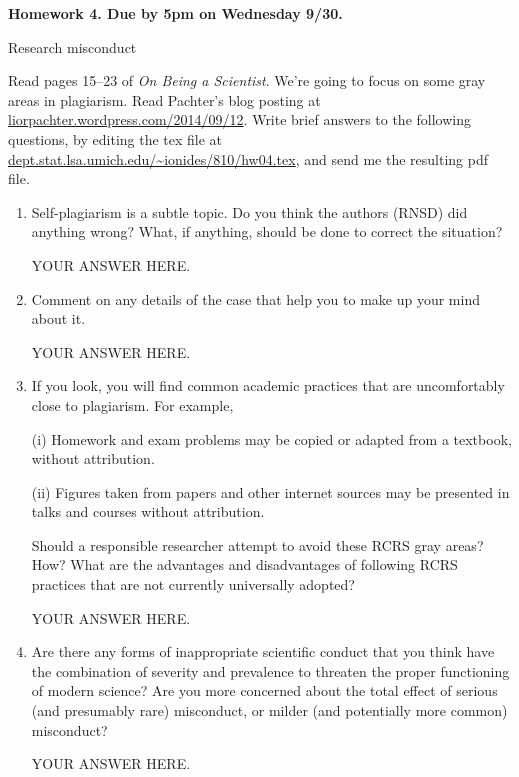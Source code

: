 \documentclass[12pt]{article}
\begin{document}
\begin{center}\bf
Homework 4. Due by 5pm on Wednesday 9/30.

Research misconduct
\end{center}
Read pages 15--23 of {\em On Being a Scientist}. We're going to focus on some gray areas in plagiarism. Read Pachter's blog posting at 
\url{liorpachter.wordpress.com/2014/09/12}.
Write brief answers to the following questions, by editing the tex file at \url{dept.stat.lsa.umich.edu/~ionides/810/hw04.tex}, and send me the resulting pdf file. 

\begin{enumerate}

\item Self-plagiarism is a subtle topic. Do you think the authors (RNSD) did anything wrong? What, if anything, should be done to correct the situation? 

YOUR ANSWER HERE.

\item Comment on any details of the case that help you to make up your mind about it.

YOUR ANSWER HERE.

\item If you look, you will find common academic practices that are uncomfortably close to plagiarism. For example,

(i) Homework and exam problems may be copied or adapted from a textbook, without attribution.

(ii) Figures taken from papers and other internet sources may be presented in talks and courses without attribution.

Should a responsible researcher attempt to avoid these RCRS gray areas? How? What are the advantages and disadvantages of following RCRS practices that are not currently universally adopted?

YOUR ANSWER HERE.

\item Are there any forms of inappropriate scientific conduct that you think have the combination of severity and prevalence to threaten the proper functioning of modern science? Are you more concerned about the total effect of serious (and presumably rare) misconduct, or milder (and potentially more common) misconduct?

YOUR ANSWER HERE.

\end{enumerate}
\end{document}
